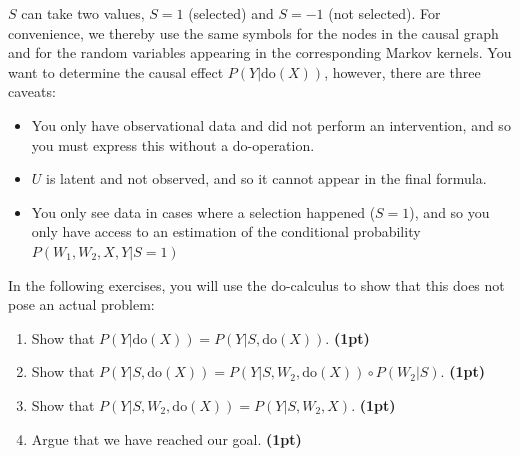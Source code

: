 $S$ can take two values, $S = 1$ (selected) and $S = -1$ (not selected). 
For convenience, we thereby use the same symbols for the nodes in the causal graph and for the random variables appearing in the corresponding Markov kernels.
You want to determine the causal effect $P(Y | \text{do}(X))$, however, there are three caveats:
\begin{itemize}
  \item You only have observational data and did not perform an intervention, and so you must express this without a do-operation. 
  \item $U$ is latent and not observed, and so it cannot appear in the final formula. 
  \item You only see data in cases where a selection happened ($S = 1$), and so you only have access to an estimation of the conditional probability $P(W_1, W_2, X, Y | S = 1)$ 
  \end{itemize}

  In the following exercises, you will use the do-calculus to show that this does not pose an actual problem:

  \begin{enumerate}
    \item Show that $P(Y | \text{do}(X)) = P(Y | S, \text{do}(X))$.  \textbf{(1pt)} 
    \item Show that $P(Y | S, \text{do}(X)) = P(Y | S, W_2, \text{do}(X)) \circ P(W_2 | S)$.  \textbf{(1pt)} 
    \item Show that  $P(Y | S, W_2, \text{do}(X)) = P(Y | S, W_2, X)$.  \textbf{(1pt)} 
    \item Argue that we have reached our goal.  \textbf{(1pt)} 
    \end{enumerate}


